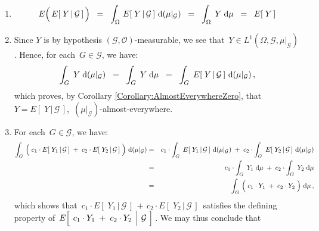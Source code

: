 \proof

\begin{enumerate}
\item
	\begin{equation*}
	E\!\left(\,\overset{{\color{white}.}}{E}\!\left[\;Y\,\vert\,\mathcal{G}\,\right]\,\right)
	\;\; = \;\;
		\int_{\Omega}\,\overset{{\color{white}.}}{E}\!\left[\;Y\,\vert\,\mathcal{G}\,\right]\,\d(\mu\vert_{\mathcal{G}})
	\;\; = \;\;
		\int_{\Omega}\;Y\;\d\mu
	\;\; = \;\;
		E\!\left[\;Y\,\right]
	\end{equation*}
\item
	Since $Y$ is by hypothesis $(\mathcal{G},\mathcal{O})$-measurable, we see that
	\,$Y \in L^{1}(\Omega,\mathcal{G},\mu\vert_{\mathcal{G}})$.
	Hence, for each \,$G \in \mathcal{G}$, we have:
	\begin{equation*}
	\int_{G}\;Y\;\textnormal{d}(\mu\vert_{\mathcal{G}})
	\;\; = \;\;
		\int_{G}\;Y\;\textnormal{d}\mu
	\;\; = \;\;
		\int_{G}\;E\!\left[\;Y\,\vert\,\mathcal{G}\,\right]\,\textnormal{d}(\mu\vert_{\mathcal{G}})\,,
	\end{equation*}
	which proves, by Corollary \ref{Corollary:AlmostEverywhereZero}, that
	\,$Y = E\!\left[\;Y\,\vert\,\mathcal{G}\,\right]$,\,
	$(\mu\vert_{\mathcal{G}})$-almost-everywhere.
\item
	For each \,$G \in \mathcal{G}$, we have:
	\begin{eqnarray*}
	\int_{G}\,\left(\;
		c_{1}\cdot E\!\left[\;Y_{1}\,\vert\,\mathcal{G}\,\right]
		\; \overset{{\color{white}.}}{+} \;
		c_{2}\cdot E\!\left[\;Y_{2}\,\vert\,\mathcal{G}\,\right]	
		\;\right)\,\d(\mu\vert_{\mathcal{G}})
	&=&
		c_{1} \cdot \int_{G}\;
			E\!\left[\;Y_{1}\,\vert\,\mathcal{G}\,\right]
			\,\d(\mu\vert_{\mathcal{G}})
		\; \overset{{\color{white}.}}{+} \;
		c_{2} \cdot \int_{G}\;
			E\!\left[\;Y_{2}\,\vert\,\mathcal{G}\,\right]	
			\,\d(\mu\vert_{\mathcal{G}})
	\\
	&=&
		c_{1} \cdot \int_{G}\;
			Y_{1}
			\;\d\mu
		\; \overset{{\color{white}.}}{+} \;
		c_{2} \cdot \int_{G}\;
			Y_{2}
			\;\d\mu
	\\
	&=&
		 \int_{G}\,\left(\;
			c_{1} \cdot Y_{1}
			\; \overset{{\color{white}.}}{+} \;
			c_{2} \cdot Y_{2}
			\;\right)\,\d\mu\,,
	\end{eqnarray*}
	which shows that
	\,$c_{1}\cdot E\!\left[\;Y_{1}\,\vert\,\mathcal{G}\,\right] \,+\, c_{2}\cdot E\!\left[\;Y_{2}\,\vert\,\mathcal{G}\,\right]$\,
	satisfies the defining property of 
	\,$E\!\left[\;\left.c_{1}\cdot Y_{1}\;\overset{{\color{white}.}}{+}\;c_{2}\cdot Y_{2}\,\;\right\vert\,\mathcal{G}\;\right]$\,.
	We may thus conclude that

\end{enumerate}
